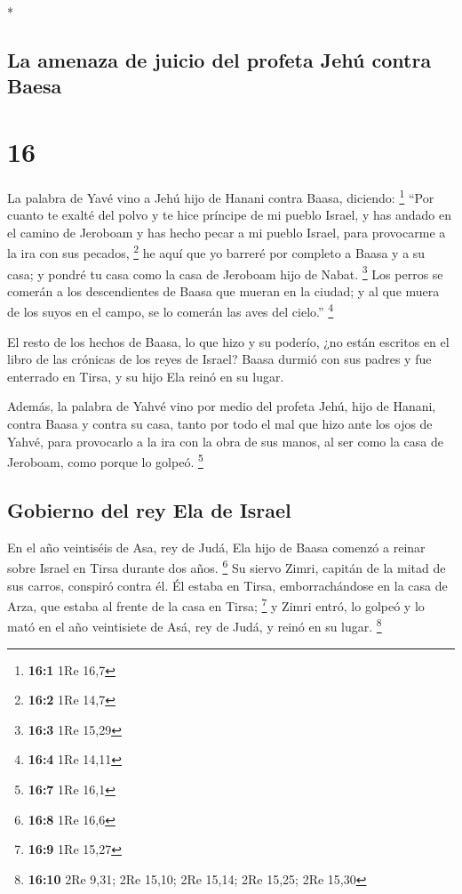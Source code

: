 \begin{paracol}{2}
\begin{otherlanguage}{english}
\end{otherlanguage}

\switchcolumn[0]*

\hypertarget{la-amenaza-de-juicio-del-profeta-jehuxfa-contra-baesa}{%
\subsection{La amenaza de juicio del profeta Jehú contra
Baesa}\label{la-amenaza-de-juicio-del-profeta-jehuxfa-contra-baesa}}

\hypertarget{section-30}{%
\section{16}\label{section-30}}

 La palabra de Yavé vino a Jehú hijo de Hanani contra
Baasa, diciendo: \footnote{\textbf{16:1} 1Re 16,7}  ``Por
cuanto te exalté del polvo y te hice príncipe de mi pueblo Israel, y has
andado en el camino de Jeroboam y has hecho pecar a mi pueblo Israel,
para provocarme a la ira con sus pecados, \footnote{\textbf{16:2} 1Re
  14,7}  he aquí que yo barreré por completo a Baasa y a
su casa; y pondré tu casa como la casa de Jeroboam hijo de Nabat.
\footnote{\textbf{16:3} 1Re 15,29}  Los perros se comerán
a los descendientes de Baasa que mueran en la ciudad; y al que muera de
los suyos en el campo, se lo comerán las aves del cielo.'' \footnote{\textbf{16:4}
  1Re 14,11}

 El resto de los hechos de Baasa, lo que hizo y su
poderío, ¿no están escritos en el libro de las crónicas de los reyes de
Israel?  Baasa durmió con sus padres y fue enterrado en
Tirsa, y su hijo Ela reinó en su lugar.

 Además, la palabra de Yahvé vino por medio del profeta
Jehú, hijo de Hanani, contra Baasa y contra su casa, tanto por todo el
mal que hizo ante los ojos de Yahvé, para provocarlo a la ira con la
obra de sus manos, al ser como la casa de Jeroboam, como porque lo
golpeó. \footnote{\textbf{16:7} 1Re 16,1}

\hypertarget{gobierno-del-rey-ela-de-israel}{%
\subsection{Gobierno del rey Ela de
Israel}\label{gobierno-del-rey-ela-de-israel}}

 En el año veintiséis de Asa, rey de Judá, Ela hijo de
Baasa comenzó a reinar sobre Israel en Tirsa durante dos años.
\footnote{\textbf{16:8} 1Re 16,6}  Su siervo Zimri,
capitán de la mitad de sus carros, conspiró contra él. Él estaba en
Tirsa, emborrachándose en la casa de Arza, que estaba al frente de la
casa en Tirsa; \footnote{\textbf{16:9} 1Re 15,27}  y
Zimri entró, lo golpeó y lo mató en el año veintisiete de Asá, rey de
Judá, y reinó en su lugar. \footnote{\textbf{16:10} 2Re 9,31; 2Re 15,10;
  2Re 15,14; 2Re 15,25; 2Re 15,30}


\end{paracol}
